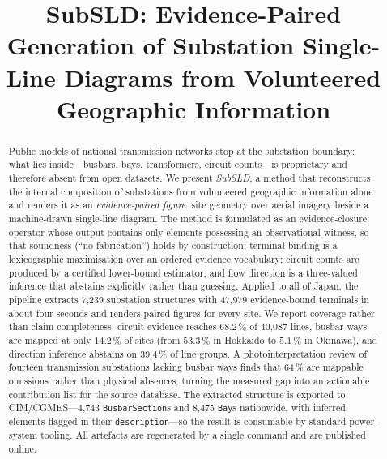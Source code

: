 \documentclass[journal]{IEEEtran}
\begin{document}
\title{SubSLD: Evidence-Paired Generation of Substation Single-Line Diagrams
from Volunteered Geographic Information}

\author{
}

\maketitle

\begin{abstract}
Public models of national transmission networks stop at the substation boundary:
what lies inside---busbars, bays, transformers, circuit counts---is proprietary
and therefore absent from open datasets. We present \emph{SubSLD}, a method that
reconstructs the internal composition of substations from volunteered geographic
information alone and renders it as an \emph{evidence-paired figure}: site
geometry over aerial imagery beside a machine-drawn single-line diagram. The
method is formulated as an evidence-closure operator whose output contains only
elements possessing an observational witness, so that soundness (``no
fabrication'') holds by construction; terminal binding is a lexicographic
maximisation over an ordered evidence vocabulary; circuit counts are produced by
a certified lower-bound estimator; and flow direction is a three-valued inference
that abstains explicitly rather than guessing. Applied to all of Japan, the
pipeline extracts 7{,}239 substation structures with 47{,}979 evidence-bound
terminals in about four seconds and renders paired figures for every site. We
report coverage rather than claim completeness: circuit evidence reaches
$68.2\,\%$ of 40{,}087 lines, busbar ways are mapped at only $14.2\,\%$ of sites
(from $53.3\,\%$ in Hokkaido to $5.1\,\%$ in Okinawa), and direction inference
abstains on $39.4\,\%$ of line groups. A photointerpretation review of fourteen
transmission substations lacking busbar ways finds that $64\,\%$ are mappable
omissions rather than physical absences, turning the measured gap into an
actionable contribution list for the source database. The extracted structure is
exported to CIM/CGMES---4{,}743 \texttt{BusbarSection}s and 8{,}475 \texttt{Bay}s
nationwide, with inferred elements flagged in their \texttt{description}---so the
result is consumable by standard power-system tooling. All artefacts are
regenerated by a single command and are published online.
\end{abstract}
\end{document}
